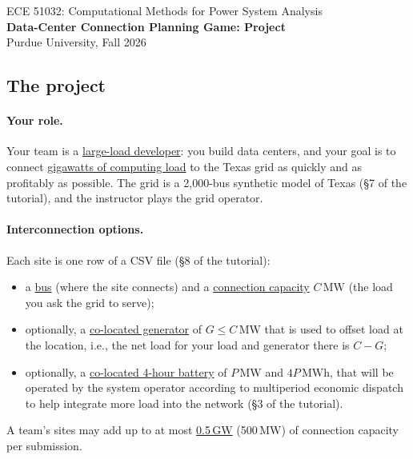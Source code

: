 \documentclass[10pt]{article}
\newcommand{\alert}[1]{{\color{alertblue}\uline{#1}}}
\newcommand{\code}[1]{\path{#1}}
\newcommand{\MW}{\ensuremath{\,\mathrm{MW}}}
\newcommand{\MWh}{\ensuremath{\,\mathrm{MWh}}}
\newcommand{\assignsection}[2]{\subsection*{#1}}
\begin{document}
\begin{center}
{\large ECE 51032: Computational Methods for Power System Analysis}\\[0.2em]
{\Large\bfseries Data-Center Connection Planning Game: Project}\\[0.2em]
Purdue University, Fall 2026
\end{center}


\assignsection{The project}{asg:glance}

\paragraph{Your role.} Your team is a \alert{large-load developer}: you build
data centers, and your goal is to connect \alert{gigawatts of computing load}
to the Texas grid as quickly and as profitably as possible. The grid is a
2,000-bus synthetic model of Texas (\S7 of the tutorial), and the instructor plays the grid operator.

\paragraph{Interconnection options.} Each site is one row of a CSV file (\S8 of the tutorial):
\begin{itemize}[leftmargin=*]
  \item a \alert{bus} (where the site connects) and a \alert{connection
    capacity} $C$\MW{} (the load you ask the grid to serve);
  \item optionally, a \alert{co-located generator} of $G \le C$\MW{} that is
    used to offset load at the location, i.e., the net load for your load and
    generator there is $C - G$;
  \item optionally, a \alert{co-located 4-hour battery} of $P$\MW{} and
    $4P$\MWh, that will be operated by the system operator according to
    multiperiod economic dispatch to help integrate more load into the network
    (\S3 of the tutorial).
\end{itemize}
A team's sites may add up to at most \alert{0.5\,GW} (500\MW) of connection
capacity per submission.
\end{document}

